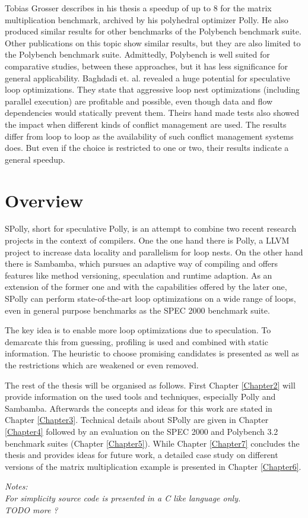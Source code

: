 Tobias Grosser describes in his thesis\cite{grosser:thesis} a speedup of up to
$8$ for the matrix multiplication benchmark, archived by his polyhedral optimizer 
Polly\cite{grosser.11.impact}. He also produced similar results for other
benchmarks of the Polybench\cite{Polybench:Online} benchmark suite. 
Other publications on this 
topic\cite{Bondhugula:2008:PAP:1379022.1375595,BCBPR10,Pradelle:2012:PPB:2086696.2086718} 
show similar results, but they are also limited to the Polybench benchmark suite.
Admittedly, Polybench is well suited for comparative studies, between these 
approaches, but it has less significance for general applicability. 
Baghdadi et. al.\cite{BCBPR10} revealed a huge potential for speculative loop 
optimizations. They state that aggressive loop nest optimizations (including 
parallel execution) are profitable and possible, even though data and flow 
dependencies would statically prevent them. 
Theirs hand made tests also showed 
the impact when different kinds of conflict management are used. 
The results differ from loop to loop as the availability of such conflict 
management systems does. But even if the choice is restricted to one or two, 
their results indicate a general speedup. 




\section{Overview}

SPolly, short for speculative Polly,
is an attempt to combine two recent research projects in the context of compilers.
One the one hand there is Polly, a LLVM project to increase data locality
and parallelism for loop nests. On the other hand there is Sambamba, which 
pursues an adaptive way of compiling and offers features like method 
versioning, speculation and runtime adaption. As an extension of the former one
and with the capabilities offered by the later one,
SPolly can perform state-of-the-art loop optimizations on a wide range of loops,
even in general purpose benchmarks as the SPEC 2000 benchmark suite. 

The key idea is to enable more loop optimizations due to speculation.
To demarcate this from guessing, profiling is used and combined with 
static information. The heuristic to choose promising candidates is presented 
as well as the restrictions  which are weakened or even removed. 


The rest of the thesis will be organised as follows. 
First Chapter \ref{Chapter2} will provide information on the used tools and techniques,
especially Polly and Sambamba. Afterwards the concepts and ideas for this work
are stated in Chapter \ref{Chapter3}. 
Technical details about SPolly are given in Chapter \ref{Chapter4} followed by 
an evaluation on the SPEC 2000 and Polybench 3.2 benchmark suites 
(Chapter \ref{Chapter5}). 
While Chapter \ref{Chapter7} concludes the thesis and provides ideas for
future work, a detailed case study on different versions of the matrix 
multiplication example is presented in Chapter \ref{Chapter6}. 

\vspace*{2cm}
{\Large \it Notes:\\}
{
  \it
For simplicity source code is presented in a C like language only. \\
TODO more ?
}



